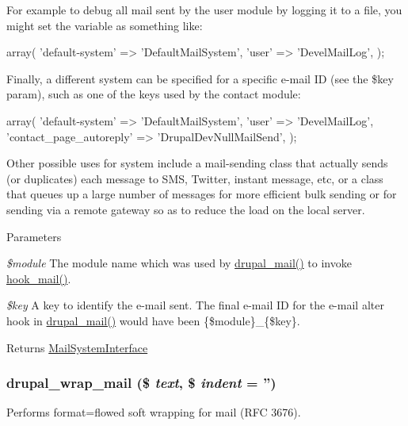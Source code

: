 For example to debug all mail sent by the user module by logging it to a file, you might set the variable as something like:


\begin{DoxyCode}
 array(
   'default-system' => 'DefaultMailSystem',
   'user' => 'DevelMailLog',
 );
\end{DoxyCode}


Finally, a different system can be specified for a specific e-\/mail ID (see the \$key param), such as one of the keys used by the contact module:


\begin{DoxyCode}
 array(
   'default-system' => 'DefaultMailSystem',
   'user' => 'DevelMailLog',
   'contact_page_autoreply' => 'DrupalDevNullMailSend',
 );
\end{DoxyCode}


Other possible uses for system include a mail-\/sending class that actually sends (or duplicates) each message to SMS, Twitter, instant message, etc, or a class that queues up a large number of messages for more efficient bulk sending or for sending via a remote gateway so as to reduce the load on the local server.


\begin{DoxyParams}{Parameters}
\item[{\em \$module}]The module name which was used by \hyperlink{mail_8inc_ab80781fd7273975a77cbbd13300eddbf}{drupal\_\-mail()} to invoke \hyperlink{group__hooks_gacdeb1cba0d0a86ac4de3fff7d4765777}{hook\_\-mail()}. \item[{\em \$key}]A key to identify the e-\/mail sent. The final e-\/mail ID for the e-\/mail alter hook in \hyperlink{mail_8inc_ab80781fd7273975a77cbbd13300eddbf}{drupal\_\-mail()} would have been \{\$module\}\_\-\{\$key\}.\end{DoxyParams}
\begin{DoxyReturn}{Returns}
\hyperlink{interfaceMailSystemInterface}{MailSystemInterface} 
\end{DoxyReturn}
\hypertarget{mail_8inc_a955ffecc70c15ab89079ea29557f7b41}{
\subsubsection[{drupal\_\-wrap\_\-mail}]{\setlength{\rightskip}{0pt plus 5cm}drupal\_\-wrap\_\-mail (\$ {\em text}, \/  \$ {\em indent} = {\ttfamily ''})}}
\label{mail_8inc_a955ffecc70c15ab89079ea29557f7b41}
Performs format=flowed soft wrapping for mail (RFC 3676).

